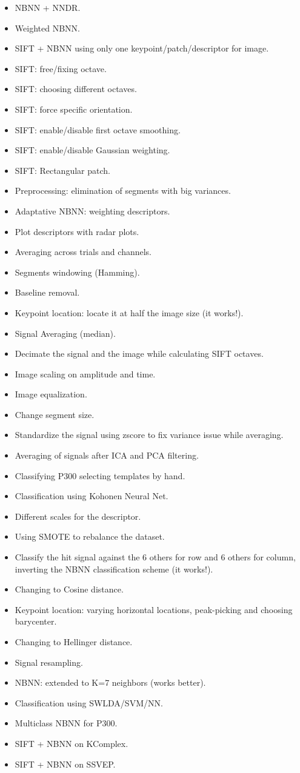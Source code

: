 \begin{itemize}
\item NBNN + NNDR.
\item Weighted NBNN.
\item SIFT + NBNN using only one keypoint/patch/descriptor for image.
\item SIFT: free/fixing octave.
\item SIFT: choosing different octaves.
\item SIFT: force specific orientation.
\item SIFT: enable/disable first octave smoothing.
\item SIFT: enable/disable Gaussian weighting.
\item SIFT: Rectangular patch.
\item Preprocessing: elimination of segments with big variances.
\item Adaptative NBNN: weighting descriptors.
\item Plot descriptors with radar plots.
\item Averaging across trials and channels.
\item Segments windowing (Hamming).
\item Baseline removal.
\item Keypoint location: locate it at half the image size (it works!).
\item Signal Averaging (median).
\item Decimate the signal and the image while calculating SIFT octaves.
\item Image scaling on amplitude and time.
\item Image equalization.
\item Change segment size.
\item Standardize the signal using zscore to fix variance issue while averaging.
\item Averaging of signals after ICA and PCA filtering.
\item Classifying P300 selecting templates by hand.
\item Classification using Kohonen Neural Net.
\item Different scales for the descriptor.
\item Using SMOTE to rebalance the dataset.
\item Classify the hit signal against the 6 others for row and 6 others for column, inverting the NBNN classification scheme (it works!).
\item Changing to Cosine distance.
\item Keypoint location: varying horizontal locations, peak-picking and choosing barycenter.
\item Changing to Hellinger distance.
\item Signal resampling.
\item NBNN: extended to K=7 neighbors (works better).
\item Classification using SWLDA/SVM/NN.
\item Multiclass NBNN for P300.
\item SIFT + NBNN on KComplex.
\item SIFT + NBNN on SSVEP.
\end{itemize}


